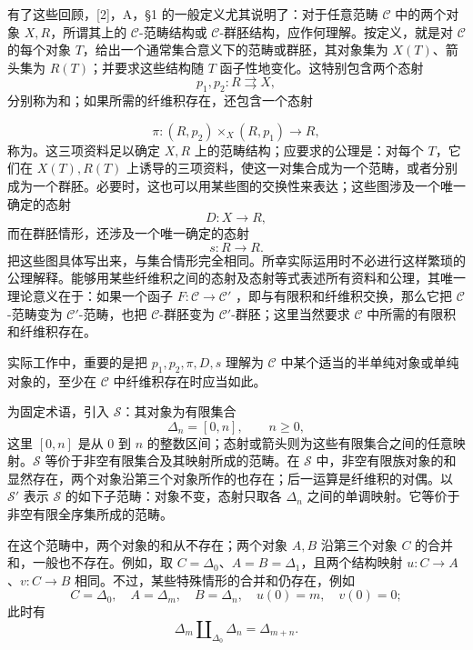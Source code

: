 有了这些回顾，[2]，A，\S1 的一般定义尤其说明了：对于任意范畴 $\mathcal C$ 中的两个对象 $X,R$，所谓其上的 $\mathcal C$-范畴结构或 $\mathcal C$-群胚结构，应作何理解。按定义，就是对 $\mathcal C$ 的每个对象 $T$，给出一个通常集合意义下的范畴或群胚，其对象集为 $X(T)$、箭头集为 $R(T)$；并要求这些结构随 $T$ 函子性地变化。这特别包含两个态射
\[
 p_1,p_2:R\rightrightarrows X,
\]
分别称为和；如果所需的纤维积存在，还包含一个态射

\[
 \pi:(R,p_2)\times_X(R,p_1)\longrightarrow R,
\]
称为。这三项资料足以确定 $X,R$ 上的范畴结构；应要求的公理是：对每个 $T$，它们在 $X(T),R(T)$ 上诱导的三项资料，使这一对集合成为一个范畴，或者分别成为一个群胚。必要时，这也可以用某些图的交换性来表达；这些图涉及一个唯一确定的态射
\[
 D:X\longrightarrow R,
\]
而在群胚情形，还涉及一个唯一确定的态射
\[
 s:R\longrightarrow R.
\]
把这些图具体写出来，与集合情形完全相同。所幸实际运用时不必进行这样繁琐的公理解释。能够用某些纤维积之间的态射及态射等式表述所有资料和公理，其唯一理论意义在于：如果一个函子 $F:\mathcal C\to\mathcal C'$ ，即与有限积和纤维积交换，那么它把 $\mathcal C$-范畴变为 $\mathcal C'$-范畴，也把 $\mathcal C$-群胚变为 $\mathcal C'$-群胚；这里当然要求 $\mathcal C$ 中所需的有限积和纤维积存在。

实际工作中，重要的是把 $p_1,p_2,\pi,D,s$ 理解为 $\mathcal C$ 中某个适当的半单纯对象或单纯对象的，至少在 $\mathcal C$ 中纤维积存在时应当如此。

为固定术语，引入 $\mathcal S$：其对象为有限集合
\[
 \Delta_n=[0,n],\qquad n\geq0,
\]
这里 $[0,n]$ 是从 $0$ 到 $n$ 的整数区间；态射或箭头则为这些有限集合之间的任意映射。$\mathcal S$ 等价于非空有限集合及其映射所成的范畴。在 $\mathcal S$ 中，非空有限族对象的和显然存在，两个对象沿第三个对象所作的也存在；后一运算是纤维积的对偶。以 $\mathcal S'$ 表示 $\mathcal S$ 的如下子范畴：对象不变，态射只取各 $\Delta_n$ 之间的单调映射。它等价于非空有限全序集所成的范畴。

在这个范畴中，两个对象的和从不存在；两个对象 $A,B$ 沿第三个对象 $C$ 的合并和，一般也不存在。例如，取 $C=\Delta_0$、$A=B=\Delta_1$，且两个结构映射 $u:C\to A$、$v:C\to B$ 相同。不过，某些特殊情形的合并和仍存在，例如
\[
 C=\Delta_0,\quad A=\Delta_m,\quad B=\Delta_n,
 \quad u(0)=m,\quad v(0)=0;
\]
此时有
\[
 \Delta_m\amalg_{\Delta_0}\Delta_n=\Delta_{m+n}.
\]

